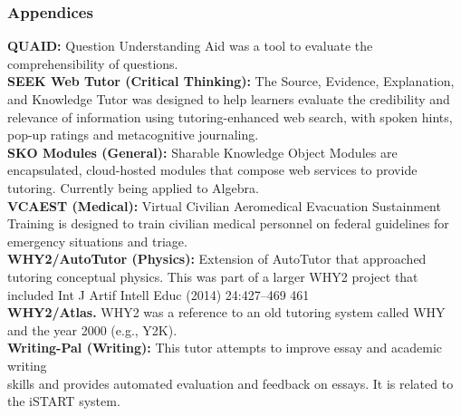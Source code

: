 \documentclass{beamer}
\begin{document}
\begin{frame}
\frametitle{Appendices}
{\tiny
	\textbf{QUAID: }Question Understanding Aid was a tool to evaluate the comprehensibility of
	questions.\\
	\textbf{SEEK Web Tutor (Critical Thinking):} The Source, Evidence, Explanation, and
Knowledge Tutor was designed to help learners evaluate the credibility and
relevance of information using tutoring-enhanced web search, with spoken
hints, pop-up ratings and metacognitive journaling.\\
\textbf{SKO Modules (General):} Sharable Knowledge Object Modules are encapsulated,
cloud-hosted modules that compose web services to provide tutoring. Currently
being applied to Algebra.\\
\textbf{VCAEST (Medical):} Virtual Civilian Aeromedical Evacuation Sustainment Training
is designed to train civilian medical personnel on federal guidelines for emergency situations and triage.\\
\textbf{WHY2/AutoTutor (Physics):} Extension of AutoTutor that approached tutoring conceptual physics. This was part of a larger WHY2 project that included
Int J Artif Intell Educ (2014) 24:427–469 461\\
\textbf{WHY2/Atlas.} WHY2 was a reference to an old tutoring system called WHY
and the year 2000 (e.g., Y2K).\\
\textbf{Writing-Pal (Writing):} This tutor attempts to improve essay and academic writing\\
skills and provides automated evaluation and feedback on essays. It is related to
the iSTART system.}
\end{frame}
\end{document}
